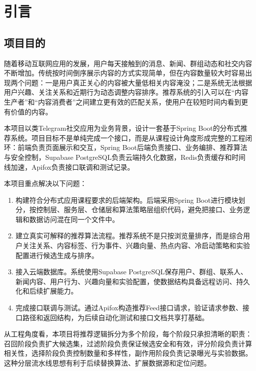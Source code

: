 
\chapter{引言}

\section{项目目的}

随着移动互联网应用的发展，用户每天接触到的消息、新闻、群组动态和社交内容不断增加。传统按时间倒序展示内容的方式实现简单，但在内容数量较大时容易出现两个问题：一是用户真正关心的内容被大量低相关内容淹没；二是系统无法根据用户兴趣、关注关系和近期行为动态调整内容排序。推荐系统的引入可以在“内容生产者”和“内容消费者”之间建立更有效的匹配关系，使用户在较短时间内看到更有价值的内容。

本项目以类Telegram社交应用为业务背景，设计一套基于Spring Boot的分布式推荐系统。项目目标不是单纯完成一个接口，而是从课程设计角度形成完整的工程闭环：前端负责页面展示和交互，Spring Boot后端负责接口、业务编排、推荐算法与安全控制，Supabase PostgreSQL负责云端持久化数据，Redis负责缓存和时间线加速，Apifox负责接口联调和测试记录。

本项目重点解决以下问题：

\begin{enumerate}
  \item 构建符合分布式应用课程要求的后端架构。后端采用Spring Boot进行模块划分，按控制层、服务层、仓储层和算法策略层组织代码，避免把接口、业务逻辑和数据访问混在同一个文件中。
  \item 建立真实可解释的推荐算法流程。推荐系统不是只按浏览量排序，而是综合用户关注关系、内容标签、行为事件、兴趣向量、热点内容、冷启动策略和实验配置进行候选生成与排序。
  \item 接入云端数据库。系统使用Supabase PostgreSQL保存用户、群组、联系人、新闻内容、用户行为、兴趣向量和实验配置，使数据结构具备远程访问、持久化和后续扩展能力。
  \item 完成接口联调与测试。通过Apifox构造推荐Feed接口请求，验证请求参数、接口路径和返回结构，为后续自动化测试和接口文档共享打基础。
\end{enumerate}

从工程角度看，本项目将推荐逻辑拆分为多个阶段，每个阶段只承担清晰的职责：召回阶段负责扩大候选集，过滤阶段负责保证候选安全和有效，评分阶段负责计算相关性，选择阶段负责控制数量和多样性，副作用阶段负责记录曝光与实验数据。这种分层流水线思想有利于后续替换算法、扩展数据源和定位问题。

